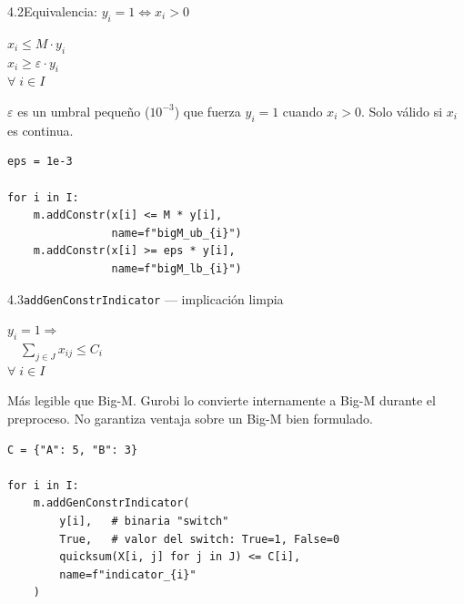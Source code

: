 \documentclass[10pt,a4paper]{article}
\newlength{\mathcolw}
\newlength{\codecolw}
\newcommand{\entryheader}[1]{%
  \needspace{5cm}%
  \vspace{6pt}%
  \noindent%
  \begin{tcolorbox}[
    colback=subsecbg!18,
    colframe=subsecbg!45,
    sharp corners, boxrule=0.4pt,
    left=5pt, right=5pt, top=2pt, bottom=2pt,
    fontupper=\small\bfseries\sffamily,
  ]
  #1
  \end{tcolorbox}%
  \vspace{2pt}%
}
\newcommand{\py}[1]{\texttt{\small #1}}
\begin{document}
\vspace{4pt}

\entryheader{4.2\quad Equivalencia: $y_i = 1 \Leftrightarrow x_i > 0$}
\noindent
\begin{minipage}[t]{\mathcolw}
    \begin{tcolorbox}[mathbox]
        $x_i \leq M \cdot y_i$\\[2pt]
        $x_i \geq \varepsilon \cdot y_i$\\[6pt]
        $\forall\; i \in I$
    \end{tcolorbox}
    \vspace{2pt}
    \begin{tcolorbox}[notebox]
        $\varepsilon$ es un umbral peque\~no ($10^{-3}$) que fuerza $y_i = 1$ cuando $x_i > 0$. Solo v\'alido si $x_i$ es continua.
    \end{tcolorbox}
\end{minipage}\hspace{0.02\textwidth}%
\begin{minipage}[t]{\codecolw}
    \begin{lstlisting}[style=gurobipy]
eps = 1e-3

for i in I:
    m.addConstr(x[i] <= M * y[i],
                name=f"bigM_ub_{i}")
    m.addConstr(x[i] >= eps * y[i],
                name=f"bigM_lb_{i}")
\end{lstlisting}
\end{minipage}

\vspace{4pt}

\entryheader{4.3\quad \py{addGenConstrIndicator} --- implicaci\'on limpia}
\noindent
\begin{minipage}[t]{\mathcolw}
    \begin{tcolorbox}[mathbox]
        $y_i = 1 \Rightarrow$\\[2pt]
        $\quad\displaystyle\sum_{j \in J} x_{ij} \leq C_i$\\[6pt]
        $\forall\; i \in I$
    \end{tcolorbox}
    \vspace{2pt}
    \begin{tcolorbox}[notebox]
        M\'as legible que Big-M. Gurobi lo convierte internamente a Big-M durante el preproceso. No garantiza ventaja sobre un Big-M bien formulado.
    \end{tcolorbox}
\end{minipage}\hspace{0.02\textwidth}%
\begin{minipage}[t]{\codecolw}
    \begin{lstlisting}[style=gurobipy]
C = {"A": 5, "B": 3}

for i in I:
    m.addGenConstrIndicator(
        y[i],   # binaria "switch"
        True,   # valor del switch: True=1, False=0
        quicksum(X[i, j] for j in J) <= C[i],
        name=f"indicator_{i}"
    )
\end{lstlisting}
\end{minipage}
\end{document}
